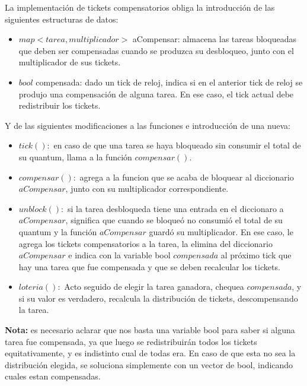 \vspace{2mm}

La implementaci\'on  de tickets compensatorios obliga la introducci\'on de las siguientes estructuras de datos:

\begin{itemize}

\item $map<tarea,multiplicador>$ aCompensar: almacena las tareas bloqueadas que deben ser compensadas cuando se produzca su desbloqueo, junto con el multiplicador de sus tickets.

\item $bool$ compensada: dado un tick de reloj, indica si en el anterior tick de reloj se produjo una compensaci\'on de alguna tarea. En ese caso, el tick actual debe redistribuir los tickets.

\end{itemize}

Y de las siguientes modificaciones a las funciones e introducci\'on de una nueva:

\begin{itemize}

\item $tick(): $ en caso de que una tarea se haya bloqueado sin consumir el total de su quantum, llama a la funci\'on $compensar()$.

\item $compensar():$ agrega a la funcion que se acaba de bloquear al diccionario $aCompensar$, junto con su multiplicador correspondiente.

\item $unblock(): $ si la tarea desbloqueda tiene una entrada en el diccionaro a $aCompensar$, significa que cuando se bloque\'o no consumi\'o el total de su quantum y la funci\'on $aCompensar$ guard\'o su multiplicador. En ese caso, le agrega los tickets compensatorios a la tarea, la elimina del diccionario $aCompensar$ e indica con la variable bool $compensada$ al pr\'oximo tick que hay una tarea que fue compensada y que se deben recalcular los tickets.

\item $loteria(): $ Acto seguido de elegir la tarea ganadora, chequea $compensada$, y si su valor es verdadero, recalcula la distribuci\'on de tickets, descompensando la tarea.

\end{itemize}

\textbf{Nota:} es necesario aclarar que nos basta una variable bool para saber si alguna tarea fue compensada, ya que luego se redistribuir\'an todos los tickets equitativamente, y es indistinto cual de todas era. En caso de que esta no sea la distribuci\'on elegida, se soluciona simplemente con un vector de bool, indicando cuales estan compensadas.


